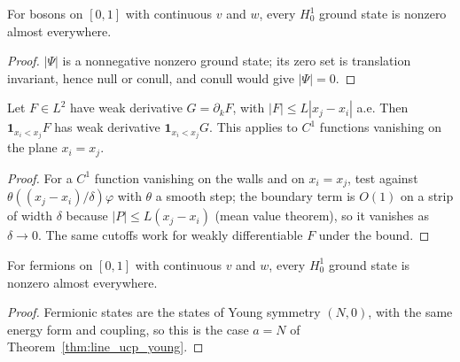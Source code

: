 \begin{theorem}
  \label{thm:line_ucp_bos}
  \leanok
  For bosons on $[0,1]$ with continuous $v$ and $w$, every $H^1_0$ ground state is nonzero almost everywhere.
\end{theorem}
\begin{proof}
  \leanok
  $|\Psi|$ is a nonnegative nonzero ground state; its zero set is translation invariant, hence null or conull, and
  conull would give $|\Psi|=0$.
\end{proof}

\begin{lemma}
  \label{lem:line_halfspace}
  \leanok
  Let $F\in L^2$ have weak derivative $G=\partial_kF$, with $|F|\le L|x_j-x_i|$ a.e. Then $\mathbf 1_{x_i<x_j}F$ has weak
  derivative $\mathbf 1_{x_i<x_j}G$. This applies to $C^1$ functions vanishing on the plane $x_i=x_j$.
\end{lemma}
\begin{proof}
  \leanok
  For a $C^1$ function vanishing on the walls and on $x_i=x_j$, test against $\theta((x_j-x_i)/\delta)\varphi$ with $\theta$ a
  smooth step; the boundary term is $O(1)$ on a strip of width $\delta$ because $|P|\le L(x_j-x_i)$ (mean value theorem),
  so it vanishes as $\delta\to0$. The same cutoffs work for weakly differentiable $F$ under the bound.
\end{proof}

\begin{theorem}
  \label{thm:line_ucp_fer}
  \leanok
  For fermions on $[0,1]$ with continuous $v$ and $w$, every $H^1_0$ ground state is nonzero almost everywhere.
\end{theorem}
\begin{proof}
  \leanok
  Fermionic states are the states of Young symmetry $(N,0)$, with the same energy form and coupling, so this is the
  case $a=N$ of Theorem~\ref{thm:line_ucp_young}.
\end{proof}

